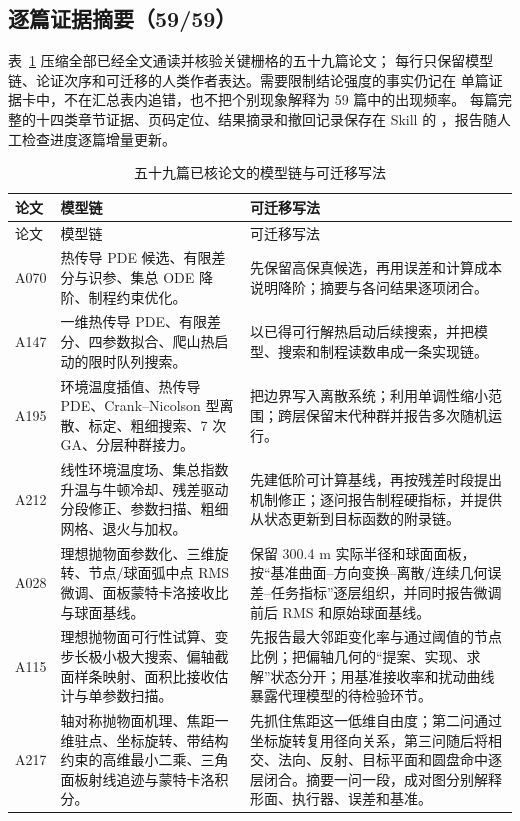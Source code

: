 \subsection{逐篇证据摘要（59/59）}

表~\ref{tab:verified-paper-cases} 压缩全部已经全文通读并核验关键栅格的五十九篇论文；
每行只保留模型链、论证次序和可迁移的人类作者表达。需要限制结论强度的事实仍记在
单篇证据卡中，不在汇总表内追错，也不把个别现象解释为 59 篇中的出现频率。
每篇完整的十四类章节证据、页码定位、结果摘录和撤回记录保存在 Skill 的
，报告随人工检查进度逐篇增量更新。

\begin{longtable}{p{1.4cm}p{5.2cm}p{7.0cm}}
\caption{五十九篇已核论文的模型链与可迁移写法}\label{tab:verified-paper-cases}\\
\toprule
论文 & 模型链 & 可迁移写法\\
\midrule
\endfirsthead
\toprule
论文 & 模型链 & 可迁移写法\\
\midrule
\endhead
A070 & 热传导 PDE 候选、有限差分与识参、集总 ODE 降阶、制程约束优化。 &
先保留高保真候选，再用误差和计算成本说明降阶；摘要与各问结果逐项闭合。\\
A147 & 一维热传导 PDE、有限差分、四参数拟合、爬山热启动的限时队列搜索。 &
以已得可行解热启动后续搜索，并把模型、搜索和制程读数串成一条实现链。\\
A195 & 环境温度插值、热传导 PDE、Crank--Nicolson 型离散、标定、粗细搜索、7 次 GA、分层种群接力。 &
把边界写入离散系统；利用单调性缩小范围；跨层保留末代种群并报告多次随机运行。\\
A212 & 线性环境温度场、集总指数升温与牛顿冷却、残差驱动分段修正、参数扫描、粗细网格、退火与加权。 &
先建低阶可计算基线，再按残差时段提出机制修正；逐问报告制程硬指标，并提供从状态更新到目标函数的附录链。\\
A028 & 理想抛物面参数化、三维旋转、节点/球面弧中点 RMS 微调、面板蒙特卡洛接收比与球面基线。 &
保留 300.4 m 实际半径和球面面板，按“基准曲面--方向变换--离散/连续几何误差--任务指标”逐层组织，并同时报告微调前后 RMS 和原始球面基线。\\
A115 & 理想抛物面可行性试算、变步长极小极大搜索、偏轴截面样条映射、面积比接收估计与单参数扫描。 &
先报告最大邻距变化率与通过阈值的节点比例；把偏轴几何的“提案、实现、求解”状态分开；用基准接收率和扰动曲线暴露代理模型的待检验环节。\\
A217 & 轴对称抛物面机理、焦距一维驻点、坐标旋转、带结构约束的高维最小二乘、三角面板射线追迹与蒙特卡洛积分。 &
先抓住焦距这一低维自由度；第二问通过坐标旋转复用径向关系，第三问随后将相交、法向、反射、目标平面和圆盘命中逐层闭合。摘要一问一段，成对图分别解释形面、执行器、误差和基准。\\

\end{longtable}
